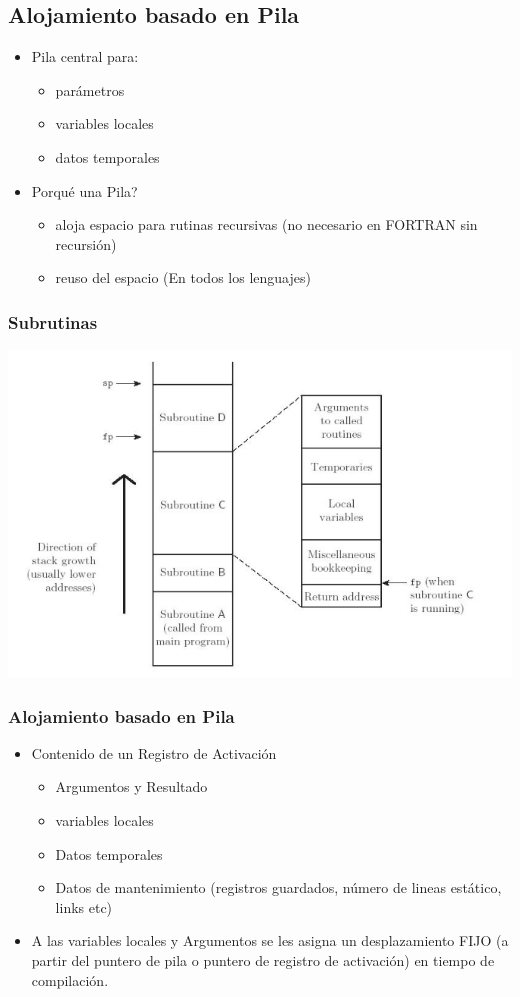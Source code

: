 \documentclass[11pt]{article}
\begin{document}
\subsection*{Alojamiento basado en Pila}
\label{sec:orgheadline9}

\begin{itemize}
\item Pila central para:
\begin{itemize}
\item parámetros
\item variables locales
\item datos temporales
\end{itemize}
\item Porqué una Pila?
\begin{itemize}
\item aloja espacio para rutinas recursivas (no necesario en FORTRAN sin recursión)
\item reuso del espacio (En todos los lenguajes)
\end{itemize}
\end{itemize}

\subsubsection*{Subrutinas}
\label{sec:orgheadline6}

\includegraphics[width=.9\linewidth]{alojpilasubr.png}

\subsubsection*{Alojamiento basado en Pila}
\label{sec:orgheadline7}
\begin{itemize}
\item Contenido de un Registro de Activación
\begin{itemize}
\item Argumentos y Resultado
\item variables locales
\item Datos temporales
\item Datos de mantenimiento (registros guardados, número de lineas
estático, links etc)
\end{itemize}
\item A las variables locales y Argumentos se les asigna un desplazamiento
FIJO (a partir del puntero de pila o puntero de registro de
activación) en tiempo de compilación.
\end{itemize}
\end{document}
